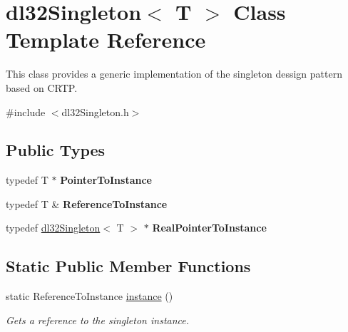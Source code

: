 \hypertarget{classdl32_singleton}{\section{dl32\-Singleton$<$ T $>$ Class Template Reference}
\label{classdl32_singleton}
}


This class provides a generic implementation of the singleton dessign pattern based on C\-R\-T\-P.  




{\ttfamily \#include $<$dl32\-Singleton.\-h$>$}

\subsection*{Public Types}
\begin{DoxyCompactItemize}
\item 
\hypertarget{classdl32_singleton_a91e984a92e08b231b641e836caf000ed}{typedef T $\ast$ {\bfseries Pointer\-To\-Instance}}\label{classdl32_singleton_a91e984a92e08b231b641e836caf000ed}

\item 
\hypertarget{classdl32_singleton_aa239c09b86dcbdb2703556d82cb72830}{typedef T \& {\bfseries Reference\-To\-Instance}}\label{classdl32_singleton_aa239c09b86dcbdb2703556d82cb72830}

\item 
\hypertarget{classdl32_singleton_a9ac35215f84e0e85a472c02b367d59f5}{typedef \hyperlink{classdl32_singleton}{dl32\-Singleton}$<$ T $>$ $\ast$ {\bfseries Real\-Pointer\-To\-Instance}}\label{classdl32_singleton_a9ac35215f84e0e85a472c02b367d59f5}

\end{DoxyCompactItemize}
\subsection*{Static Public Member Functions}
\begin{DoxyCompactItemize}
\item 
static Reference\-To\-Instance \hyperlink{classdl32_singleton_af2f4cfbdfd67cdc551f474fcba23b524}{instance} ()
\begin{DoxyCompactList}\small\item\em Gets a reference to the singleton instance. \end{DoxyCompactList}\end{DoxyCompactItemize}


